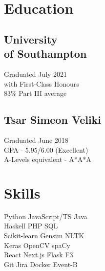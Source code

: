 \documentclass[]{resume}
\begin{document}
\hfill
%
%
\begin{minipage}[t]{0.30\textwidth} 


\section{Education} 

\subsection*{University \\ of Southampton}
Graduated July 2021\\
with First-Class Honours\\
83\% Part III average
\sectionsep
\sectionsep
\subsection*{Tsar Simeon Veliki}
Graduated June 2018\\
GPA - 5.95/6.00 (Excellent)\\
A-Levels equivalent - A*A*A
\sectionsep


\section{Skills}
Python \textbullet{} JavaScript/TS \textbullet{} Java\\Haskell \textbullet{} PHP \textbullet{} SQL\\
Scikit-learn \textbullet{} Gensim \textbullet{} NLTK\\Keras \textbullet{} OpenCV \textbullet{} spaCy\\
React \textbullet{} Next.js \textbullet{} Flask \textbullet{} F3\\
Git \textbullet{} Jira \textbullet{} Docker \textbullet{} Event-B


\end{minipage}
\end{document}
